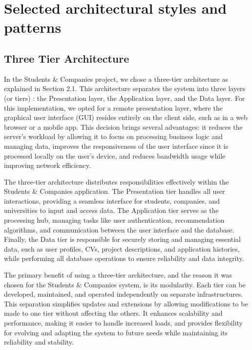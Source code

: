 \pagebreak
\section{Selected architectural styles and patterns}

\subsection{Three Tier Architecture}
In the Students \& Companies project, we chose a three-tier architecture as explained in Section 2.1. This architecture separates the system into three layers (or tiers) : the Presentation layer, the Application layer, and the Data layer. For this implementation, we opted for a remote presentation layer, where the graphical user interface (GUI) resides entirely on the client side, such as in a web browser or a mobile app. This decision brings several advantages: it reduces the server's workload by allowing it to focus on processing business logic and managing data, improves the responsiveness of the user interface since it is processed locally on the user’s device, and reduces bandwidth usage while improving network efficiency.

The three-tier architecture distributes responsibilities effectively within the Students \& Companies application. The Presentation tier handles all user interactions, providing a seamless interface for students, companies, and universities to input and access data. The Application tier serves as the processing hub, managing tasks like user authentication, recommendation algorithms, and communication between the user interface and the database. Finally, the Data tier is responsible for securely storing and managing essential data, such as user profiles, CVs, project descriptions, and application histories, while performing all database operations to ensure reliability and data integrity.

The primary benefit of using a three-tier architecture, and the reason it was chosen for the Students \& Companies system, is its modularity. Each tier can be developed, maintained, and operated independently on separate infrastructures. This separation simplifies updates and extensions by allowing modifications to be made to one tier without affecting the others. It enhances scalability and performance, making it easier to handle increased loads, and provides flexibility for evolving and adapting the system to future needs while maintaining its reliability and stability.

\pagebreak
